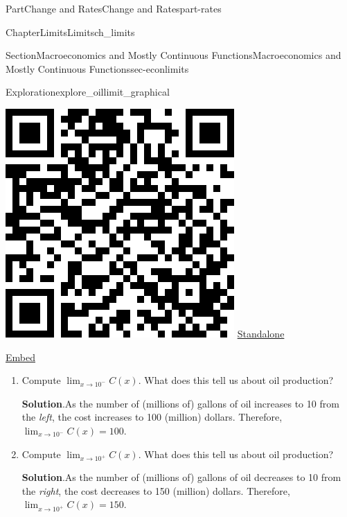 \documentclass{tufte-book}
\newcommand{\blocktitlefont}{\relax}
\numberwithin{equation}{chapter}
\begin{document}
\begin{partptx}{Part}{Change and Rates}{}{Change and Rates}{}{}{part-rates}
\begin{chapterptx}{Chapter}{Limits}{}{Limits}{}{}{ch_limits}
\begin{sectionptx}{Section}{Macroeconomics and Mostly Continuous Functions}{}{Macroeconomics and Mostly Continuous Functions}{}{}{sec-econlimits}
\begin{exploration}{Exploration}{}{explore_oillimit_graphical}
\begin{sidebyside}{2}{0.075}{0.075}{0.17}
\begin{sbspanel}{0.21}
\includegraphics[width=\linewidth]{generated/qrcode/explore_oillimit_graphical-1-2.png}
\href{http://webwork.bridgew.edu/oer/functions_at_work/explore_oillimit_graphical-1-2.html}{Standalone}%
\par
\href{http://webwork.bridgew.edu/oer/functions_at_work/explore_oillimit_graphical-1-2-if.html}{Embed}%
\end{sbspanel}%
\end{sidebyside}%
\begin{enumerate}[font=\bfseries,label=(\alph*),ref=\alph*]%
\item{}Compute \(\lim_{x\rightarrow 10^-}C(x).\) What does this tell us about oil production?%
\par\smallskip%
\noindent\textbf{\blocktitlefont Solution}.\hypertarget{explore_oillimit_graphical-2-2}{}\quad{}As the number of (millions of) gallons of oil increases to 10 from the \emph{left}, the cost increases to \textdollar{}100 (million) dollars. Therefore,   \(\lim_{x\rightarrow 10^-}C(x)= 100.\)%
\item{}Compute \(\lim_{x\rightarrow 10^+}C(x).\) What does this tell us about oil production?%
\par\smallskip%
\noindent\textbf{\blocktitlefont Solution}.\hypertarget{explore_oillimit_graphical-3-2}{}\quad{}As the number of (millions of) gallons of oil decreases to 10 from the \emph{right}, the cost decreases to \textdollar{}150 (million) dollars. Therefore,   \(\lim_{x\rightarrow 10^+}C(x)= 150.\)%

\end{enumerate}
\end{exploration}
\end{sectionptx}
\end{chapterptx}
\end{partptx}
\end{document}
